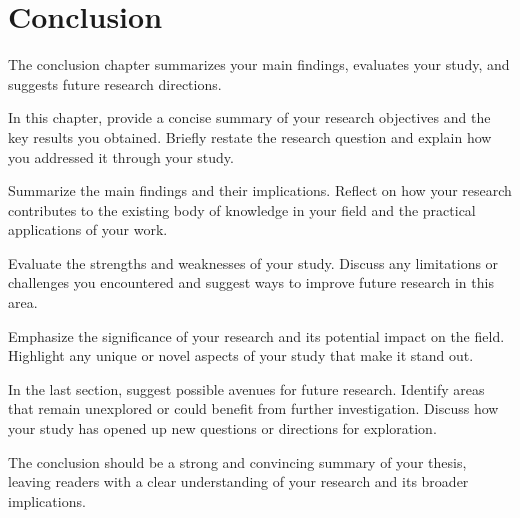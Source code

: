 \chapter{Conclusion}

The conclusion chapter summarizes your main findings, evaluates your study, and suggests future research directions.

In this chapter, provide a concise summary of your research objectives and the key results you obtained. Briefly restate the research question and explain how you addressed it through your study.

Summarize the main findings and their implications. Reflect on how your research contributes to the existing body of knowledge in your field and the practical applications of your work.

Evaluate the strengths and weaknesses of your study. Discuss any limitations or challenges you encountered and suggest ways to improve future research in this area.

Emphasize the significance of your research and its potential impact on the field. Highlight any unique or novel aspects of your study that make it stand out.

In the last section, suggest possible avenues for future research. Identify areas that remain unexplored or could benefit from further investigation. Discuss how your study has opened up new questions or directions for exploration.

The conclusion should be a strong and convincing summary of your thesis, leaving readers with a clear understanding of your research and its broader implications.

